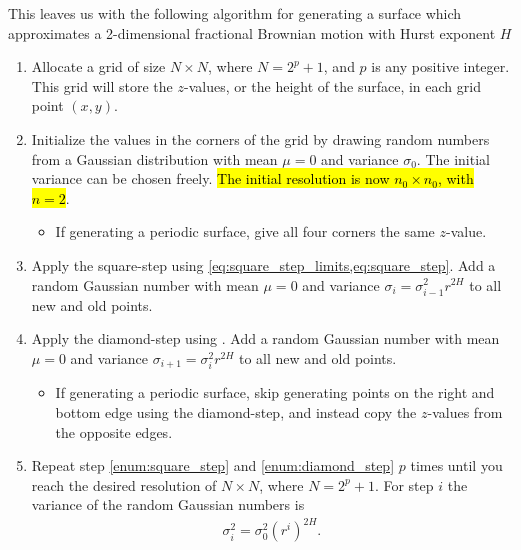 This leaves us with the following algorithm for generating a surface which approximates a 2-dimensional fractional Brownian motion with Hurst exponent $H$
\begin{enumerate}
    \renewcommand{\labelitemii}{$\bullet$}
    
    \item Allocate a grid of size $N\times N$, where $N = 2^p + 1$, and $p$ is any positive integer. This grid will store the $z$-values, or the height of the surface, in each grid point $(x,y)$.

    \item Initialize the values in the corners of the grid by drawing random numbers from a Gaussian distribution with mean $\mu = 0$ and variance $\sigma_0$. The initial variance can be chosen freely. \hl{The initial resolution is now $n_0\times n_0$, with $n = 2$}.
    \begin{itemize}
        \item If generating a periodic surface, give all four corners the same $z$-value.
    \end{itemize}
    
    \item Apply the square-step using \cref{eq:square_step_limits,eq:square_step}. Add a random Gaussian number with mean $\mu = 0$ and variance $\sigma_i = \sigma_{i-1}^2r^{2H}$ to all new and old points.
    \label{enum:square_step}

    \item Apply the diamond-step using . Add a random Gaussian number with mean $\mu = 0$ and variance $\sigma_{i+1} = \sigma_i^2r^{2H}$ to all new and old points.
    \label{enum:diamond_step}
    
    \begin{itemize}
        \item If generating a periodic surface, skip generating points on the right and bottom edge using the diamond-step, and instead copy the $z$-values from the opposite edges.
    \end{itemize}
    
    \item Repeat step \ref{enum:square_step} and \ref{enum:diamond_step} $p$ times until you reach the desired resolution of $N\times N$, where $N = 2^p + 1$. For step $i$ the variance of the random Gaussian numbers is
    \begin{align*}
        \sigma_i^2 = \sigma_0^2(r^i)^{2H}.
    \end{align*}
\end{enumerate}

